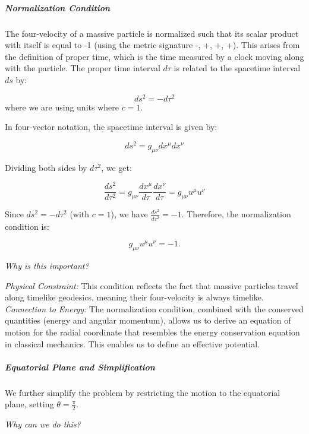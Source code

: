 \documentclass{article}
\begin{document}
\subparagraph{Normalization Condition}

The four-velocity of a massive particle is normalized such that its scalar product with itself is equal to -1 (using the metric signature -, +, +, +). This arises from the definition of proper time, which is the time measured by a clock moving along with the particle. The proper time interval \(d\tau\) is related to the spacetime interval \(ds\) by:

\begin{equation*}
ds^2 = - d\tau^2
\end{equation*}
where we are using units where $c=1$.

In four-vector notation, the spacetime interval is given by:

\begin{equation*}
ds^2 = g_{\mu\nu} dx^\mu dx^\nu
\end{equation*}

Dividing both sides by \(d\tau^2\), we get:

\begin{equation*}
\frac{ds^2}{d\tau^2} = g_{\mu\nu} \frac{dx^\mu}{d\tau} \frac{dx^\nu}{d\tau} = g_{\mu\nu}u^\mu u^\nu
\end{equation*}

Since \(ds^2 = -d\tau^2\) (with $c=1$), we have \(\frac{ds^2}{d\tau^2} = -1\). Therefore, the normalization condition is:

\begin{equation*}
g_{\mu\nu}u^\mu u^\nu = -1.
\end{equation*}

\textit{Why is this important?}

\textit{Physical Constraint:} This condition reflects the fact that massive particles travel along timelike geodesics, meaning their four-velocity is always timelike.\\
\textit{Connection to Energy:} The normalization condition, combined with the conserved quantities (energy and angular momentum), allows us to derive an equation of motion for the radial coordinate that resembles the energy conservation equation in classical mechanics. This enables us to define an effective potential.

\subparagraph{Equatorial Plane and Simplification}

We further simplify the problem by restricting the motion to the equatorial plane, setting \(\theta = \frac{\pi}{2}\).

\textit{Why can we do this?}
\end{document}

